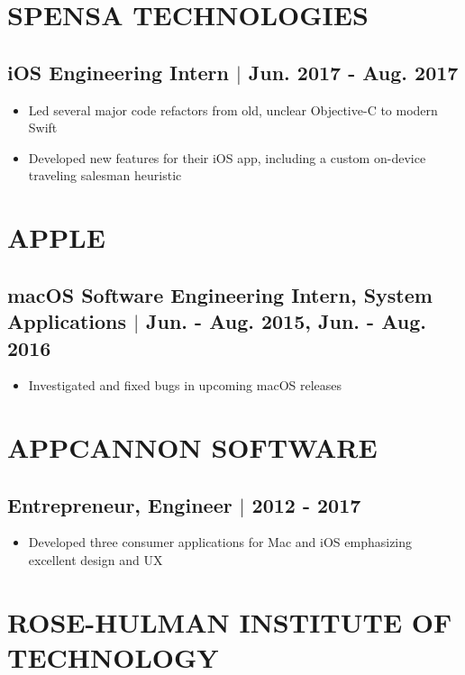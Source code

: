 \documentclass[10pt]{article}
\begin{document}
\section{SPENSA TECHNOLOGIES}
\subsection{iOS Engineering Intern $\vert$ Jun. 2017 - Aug. 2017}
\begin{itemize}
    \item Led several major code refactors from old, unclear Objective-C to modern Swift
    \item Developed new features for their iOS app, including a custom on-device traveling salesman heuristic
\end{itemize}

\section{APPLE}
\subsection{macOS Software Engineering Intern, System Applications $\vert$ Jun. - Aug. 2015, Jun. - Aug. 2016}
\begin{itemize}
    \item Investigated and fixed bugs in upcoming macOS releases
\end{itemize}

\section{APPCANNON SOFTWARE}
\subsection{Entrepreneur, Engineer $\vert$ 2012 - 2017}
\begin{itemize}
    \item Developed three consumer applications for Mac and iOS emphasizing excellent design and UX
\end{itemize}


\section{ROSE-HULMAN INSTITUTE OF TECHNOLOGY}
\end{document}
